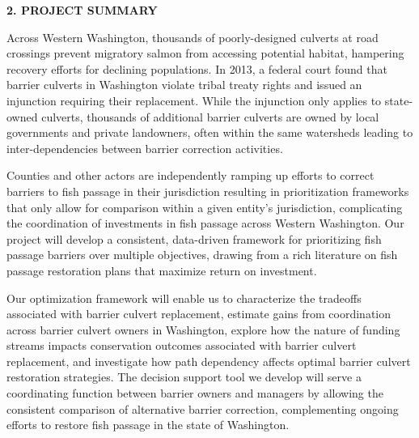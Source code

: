 \begin{center} \textbf{2. PROJECT SUMMARY} \end{center}




			Across Western Washington, thousands of poorly-designed culverts at road crossings prevent migratory salmon from accessing potential habitat, hampering recovery efforts for declining populations. In 2013, a federal court found that barrier culverts in Washington violate tribal treaty rights and issued an injunction requiring their replacement. While the injunction only applies to state-owned culverts, thousands of additional barrier culverts are owned by local governments and private landowners, often within the same watersheds leading to inter-dependencies between barrier correction activities. 
			
			Counties and other actors are independently ramping up efforts to correct barriers to fish passage in their jurisdiction resulting in prioritization frameworks that only allow for comparison within a given entity's jurisdiction, complicating the coordination of investments in fish passage across Western Washington. Our project will develop a consistent, data-driven framework for prioritizing fish passage barriers over multiple objectives, drawing from a rich literature on fish passage restoration plans that maximize return on investment. 
			
			Our optimization framework will enable us to characterize the tradeoffs associated with barrier culvert replacement, estimate gains from coordination across barrier culvert owners in Washington, explore how the nature of funding streams impacts conservation outcomes associated with barrier culvert replacement, and investigate how path dependency affects optimal barrier culvert restoration strategies. The decision support tool we develop will serve a coordinating function between barrier owners and managers by allowing the consistent comparison of alternative barrier correction, complementing ongoing efforts to restore fish passage in the state of Washington.
